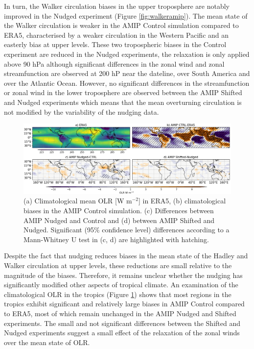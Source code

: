In turn, the Walker circulation biases in the upper troposphere are notably improved in the Nudged experiment (Figure \ref{fig:walkeramip}). The mean state of the Walker circulation is weaker in the AMIP Control simulation compared to ERA5, characterised by a weaker circulation in the Western Pacific and an easterly bias at upper levels. These two tropospheric biases in the Control experiment are reduced in the Nudged experiments, the relaxation is only applied above 90 hPa although significant differences in the zonal wind and zonal streamfunction are observed at 200 hP near the dateline, over South America and over the Atlantic Ocean. 
However, no significant differences in the streamfunction or zonal wind in the lower troposphere are observed between the AMIP Shifted and Nudged experiments which means that the mean overturning circulation is not modified by the variability of the nudging data.

\begin{figure}[t!]
\centering
 \includegraphics[width=\linewidth]{figures/olr_check.png}
\caption[Annual mean OLR  in atmosphere-only experiments]{(a) Climatological mean OLR [W m$^{-2}$] in ERA5, (b) climatological biases in the AMIP Control simulation. (c) Differences between AMIP Nudged and Control and (d) between AMIP Shifted and Nudged. Significant (95\% confidence level) differences according to a Mann-Whitney U test in (c, d) are highlighted with hatching. }
\label{fig:olr-mean}
\end{figure}

Despite the fact that nudging reduces biases in the mean state of the Hadley and Walker circulation at upper levels, these reductions are small relative to the magnitude of the biases. 
Therefore, it remains unclear whether the nudging has significantly modified other aspects of tropical climate. 
An examination of the climatological  OLR in the tropics (Figure \ref{fig:olr-mean}) shows that most regions in the tropics exhibit significant and relatively large biases in AMIP Control compared to ERA5, most of which remain unchanged in the AMIP Nudged and Shifted experiments. The small and not significant differences between the Shifted and Nudged experiments suggest a small effect of the relaxation of the zonal winds over the mean state of OLR. 

